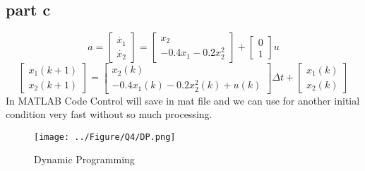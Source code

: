 \subsection{part c}
$$
a = \begin{bmatrix}
	\dot{x_1}\\
	\dot{x_2}
\end{bmatrix} = \begin{bmatrix}
	x_2\\
	-0.4x_1 -0.2x_2^2
\end{bmatrix} + \begin{bmatrix}
	0\\
	1
\end{bmatrix}u
$$
$$
\begin{bmatrix}
	x_1(k+1)\\
	x_2(k+1)
\end{bmatrix} = \begin{bmatrix}
	x_2(k)\\
	-0.4x_1(k) -0.2x_2^2(k) + u(k)
\end{bmatrix} \Delta t + \begin{bmatrix}
	x_1(k)\\
	x_2(k)
\end{bmatrix}
$$
In MATLAB Code Control will save in mat file and we can use for another initial condition very fast without so much processing.
\begin{figure}[H]
	\caption{Dynamic Programming}
	\centering
	\texttt{[image: ../Figure/Q4/DP.png]}
\end{figure}